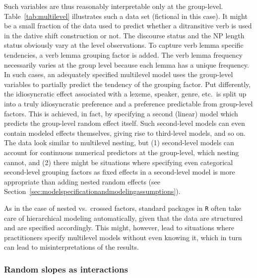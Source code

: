 \documentclass[a4paper,12pt]{article}
\begin{document}
Such variables are thus reasonably interpretable only at the group-level.
Table~\ref{tab:multilevel} illustrates such a data set (fictional in this case).
It might be a small fraction of the data used to predict whether a ditransitive verb is used in the dative shift construction or not.
The discourse status and the NP length status obviously vary at the level observations.
To capture verb lemma specific tendencies, a verb lemma grouping factor is added.
The verb lemma frequency necessarily varies at the group level because each lemma has a unique frequency.
In such cases, an adequately specified multilevel model uses the group-level variables to partially predict the tendency of the grouping factor.
Put differently, the idiosyncratic effect associated with a lexeme, speaker, genre, etc.\ is split up into a truly idiosyncratic preference and a preference predictable from group-level factors.
This is achieved, in fact, by specifying a second (linear) model which predicts the group-level random effect itself.
Such second-level models can even contain modeled effects themselves, giving rise to third-level models, and so on.
The data look similar to multilevel nesting, but (1) second-level models can account for continuous numerical predictors at the group-level, which nesting cannot, and (2) there might be situations where specifying even categorical second-level grouping factors as fixed effects in a second-level model is more appropriate than adding nested random effects (see Section~\ref{sec:modelspecificationandmodelingassumptions}).

As in the case of nested vs.\ crossed factors, standard packages in \texttt{R} often take care of hierarchical modeling automatically, given that the data are structured and are specified accordingly.
This might, however, lead to situations where practitioners specify multilevel models without even knowing it, which in turn can lead to misinterpretations of the results.

\subsubsection{Random slopes as interactions}
\label{sec:randominterceptsandslopes}
\end{document}
